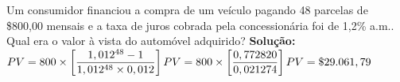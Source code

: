 \begin{example}
 	Um consumidor financiou a compra de um veículo pagando 48 parcelas de \$800,00 mensais e a taxa de juros cobrada pela concessionária foi de 1,2\% a.m.. Qual era o valor à vista do automóvel adquirido?
 	\newline
 	\textbf{Solução:}
 	\newline
 	$PV = 800 \times \left[ \dfrac{1,012^{48}-1}{1,012^{48}\times 0,012} \right] \newline
 	PV = 800 \times \left[ \dfrac{0,772820}{0,021274} \right] \newline
 	PV = \$29.061,79$
 \end{example}

